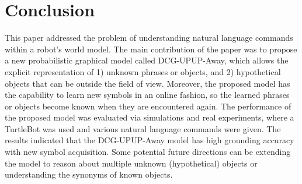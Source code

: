 \section{Conclusion}
\label{sec:conclusion}
This paper addressed the problem of understanding natural language commands within a robot's world model. The main contribution of the paper was to propose a new probabilistic graphical model called DCG-UPUP-Away, which allows the explicit representation of 1) unknown phrases or objects, and 2) hypothetical objects that can be outside the field of view. Moreover, the proposed model has the capability to learn new symbols in an online fashion, so the learned phrases or objects become known when they are encountered again. The performance of the proposed model was evaluated via simulations and real experiments, where a TurtleBot was used and various natural language commands were given. The results indicated that the DCG-UPUP-Away model has high grounding accuracy with new symbol acquisition. Some potential future directions can be extending the model to reason about multiple unknown (hypothetical) objects or understanding the synonyms of known objects.